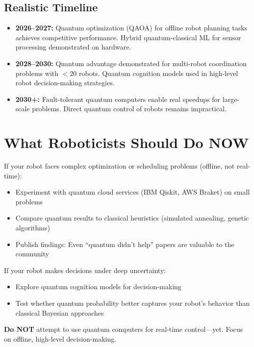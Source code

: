 \documentclass[conference]{IEEEtran}
\begin{document}
\subsection{Realistic Timeline}

\begin{itemize}
\item \textbf{2026--2027:} Quantum optimization (QAOA) for offline robot planning tasks achieves competitive performance. Hybrid quantum-classical ML for sensor processing demonstrated on hardware.

\item \textbf{2028--2030:} Quantum advantage demonstrated for multi-robot coordination problems with $<20$ robots. Quantum cognition models used in high-level robot decision-making strategies.

\item \textbf{2030+:} Fault-tolerant quantum computers enable real speedups for large-scale problems. Direct quantum control of robots remains impractical.
\end{itemize}

\section{What Roboticists Should Do NOW}

If your robot faces complex optimization or scheduling problems (offline, not real-time):

\begin{itemize}
\item Experiment with quantum cloud services (IBM Qiskit, AWS Braket) on small problems
\item Compare quantum results to classical heuristics (simulated annealing, genetic algorithms) \cite{b59, b61}
\item Publish findings: Even ``quantum didn't help'' papers are valuable to the community
\end{itemize}

If your robot makes decisions under deep uncertainty:

\begin{itemize}
\item Explore quantum cognition models for decision-making \cite{b48, b62}
\item Test whether quantum probability better captures your robot's behavior than classical Bayesian approaches
\end{itemize}

\textbf{Do NOT} attempt to use quantum computers for real-time control---yet. Focus on offline, high-level decision-making.
\end{document}
